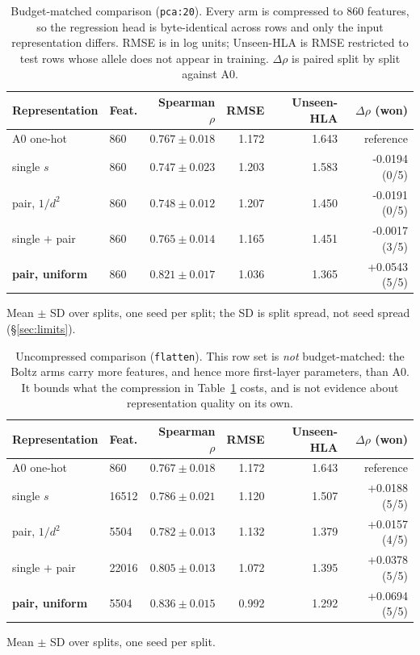 \begin{table}[t]
\centering
\small
\begin{tabular}{llrrrr}
\toprule
Representation & Feat. & Spearman $\rho$ & RMSE & Unseen-HLA & $\Delta\rho$ (won) \\
\midrule
A0 one-hot & 860 & $0.767 \pm 0.018$ & 1.172 & 1.643 & reference \\
\armbzs{} single $s$ & 860 & $0.747 \pm 0.023$ & 1.203 & 1.583 & -0.0194 (0/5) \\
\armbzz{} pair, $1/d^2$ & 860 & $0.748 \pm 0.012$ & 1.207 & 1.450 & -0.0191 (0/5) \\
\armbzsz{} single $+$ pair & 860 & $0.765 \pm 0.014$ & 1.165 & 1.451 & -0.0017 (3/5) \\
\bfseries \armbzzu{} pair, uniform & 860 & $0.821 \pm 0.017$ & 1.036 & 1.365 & +0.0543 (5/5) \\
\bottomrule
\end{tabular}
\caption{Budget-matched comparison (\texttt{pca:20}). Every arm is compressed to 860 features, so the regression head is byte-identical across rows and only the input representation differs. RMSE is in log units; Unseen-HLA is RMSE restricted to test rows whose allele does not appear in training. $\Delta\rho$ is paired split by split against A0.}
\label{tab:pca20}
\vspace{2pt}\footnotesize Mean $\pm$ SD over \nsplits{} splits, one seed per split; the SD is split spread, not seed spread (\S\ref{sec:limits}).
\end{table}

\begin{table}[t]
\centering
\small
\begin{tabular}{llrrrr}
\toprule
Representation & Feat. & Spearman $\rho$ & RMSE & Unseen-HLA & $\Delta\rho$ (won) \\
\midrule
A0 one-hot & 860 & $0.767 \pm 0.018$ & 1.172 & 1.643 & reference \\
\armbzs{} single $s$ & 16512 & $0.786 \pm 0.021$ & 1.120 & 1.507 & +0.0188 (5/5) \\
\armbzz{} pair, $1/d^2$ & 5504 & $0.782 \pm 0.013$ & 1.132 & 1.379 & +0.0157 (4/5) \\
\armbzsz{} single $+$ pair & 22016 & $0.805 \pm 0.013$ & 1.072 & 1.395 & +0.0378 (5/5) \\
\bfseries \armbzzu{} pair, uniform & 5504 & $0.836 \pm 0.015$ & 0.992 & 1.292 & +0.0694 (5/5) \\
\bottomrule
\end{tabular}
\caption{Uncompressed comparison (\texttt{flatten}). This row set is \emph{not} budget-matched: the Boltz arms carry more features, and hence more first-layer parameters, than A0. It bounds what the compression in Table~\ref{tab:pca20} costs, and is not evidence about representation quality on its own.}
\label{tab:flatten}
\vspace{2pt}\footnotesize Mean $\pm$ SD over \nsplits{} splits, one seed per split.
\end{table}
